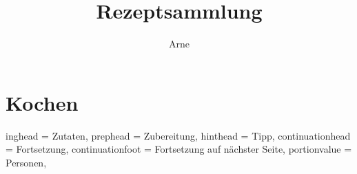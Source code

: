 \documentclass[%
a4paper,
11pt
]{article}
\title{Rezeptsammlung}
\author{Arne}
\begin{document}


\tableofcontents

\vspace{5em}

\section{Kochen}
\pagebreak


\setHeadlines
{%
    inghead = Zutaten,
    prephead = Zubereitung,
    hinthead = Tipp,
    continuationhead = Fortsetzung,
    continuationfoot = Fortsetzung auf n\"achster Seite,
    portionvalue = Personen,
}
\end{document}
